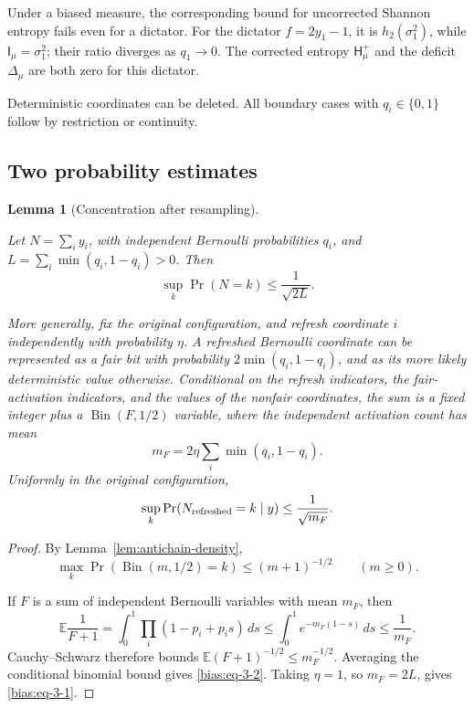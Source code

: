 \documentclass[11pt]{amsart}
\newtheorem{lemma}[theorem]{Lemma}
\theoremstyle{definition}
\theoremstyle{remark}
\newcommand{\HH}{\mathsf H}
\newcommand{\I}{\mathsf I}
\begin{document}
Under a biased measure, the corresponding bound for uncorrected Shannon entropy fails even for a dictator. For the dictator \(f=2y_1-1\), it is \(h_2(\sigma_1^2)\), while \(\I_\mu=\sigma_1^2\); their ratio diverges as \(q_1\to0\). The corrected entropy \(\HH_\mu^+\) and the deficit \(\Delta_\mu\) are both zero for this dictator.

Deterministic coordinates can be deleted. All boundary cases with \(q_i\in\{0,1\}\) follow by restriction or continuity.

\subsection{Two probability estimates}\label{bias:probability}

\begin{lemma}[Concentration after resampling]\label{bias:concentration}

Let \(N=\sum_i y_i\), with independent Bernoulli probabilities \(q_i\), and \(L=\sum_i\min(q_i,1-q_i)>0\). Then \begin{equation}\label{bias:eq-3-1}
\sup_k\Pr(N=k)\le \frac1{\sqrt{2L}}.
\end{equation}

More generally, fix the original configuration, and refresh coordinate \(i\) independently with probability \(\eta\). A refreshed Bernoulli coordinate can be represented as a fair bit with probability \(2\min(q_i,1-q_i)\), and as its more likely deterministic value otherwise. Conditional on the refresh indicators, the fair-activation indicators, and the values of the nonfair coordinates, the sum is a fixed integer plus a \(\operatorname{Bin}(F,1/2)\) variable, where the independent activation count has mean \[
 m_F=2\eta\sum_i\min(q_i,1-q_i).
\] Uniformly in the original configuration, \begin{equation}\label{bias:eq-3-2}
\sup_k\Pr(N_{\rm refreshed}=k\mid y)
    \le \frac1{\sqrt{m_F}}.
\end{equation}

\end{lemma}
\begin{proof}

By Lemma~\ref{lem:antichain-density}, \[
 \max_k\Pr(\operatorname{Bin}(m,1/2)=k)\le(m+1)^{-1/2}
 \qquad(m\ge0).
\]

If \(F\) is a sum of independent Bernoulli variables with mean \(m_F\), then \[
 \mathbb E\frac1{F+1}
 =\int_0^1\prod_i(1-p_i+p_i s)\,ds
 \le\int_0^1e^{-m_F(1-s)}\,ds\le\frac1{m_F}.
\] Cauchy--Schwarz therefore bounds \(\mathbb E(F+1)^{-1/2}\le m_F^{-1/2}\). Averaging the conditional binomial bound gives \eqref{bias:eq-3-2}. Taking \(\eta=1\), so \(m_F=2L\), gives \eqref{bias:eq-3-1}.

\end{proof}
\end{document}
